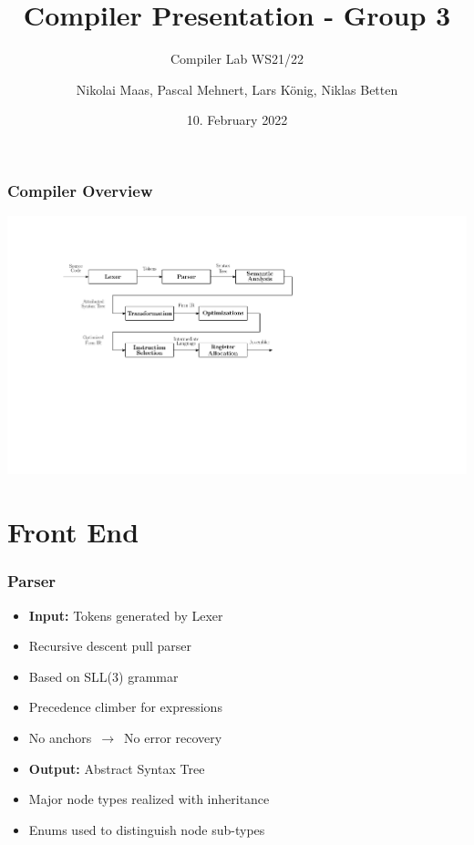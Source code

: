 \documentclass[navbaroff,en]{sdqbeamer}
\title{Compiler Presentation - Group 3}
\subtitle{Compiler Lab WS21/22}
\author[Nikolai, Pascal, Lars, Niklas]{Nikolai Maas, Pascal Mehnert, Lars König, Niklas Betten}
\date[10.\,2.\,2022]{10. February 2022}
\begin{document}
\KITtitleframe

\begin{frame}
	\frametitle{Compiler Overview}

	\centering \includegraphics[scale=0.5]{images/phases.ipe.pdf}

\end{frame}


\section{Front End}

\begin{frame}
	\frametitle{Parser}

	\begin{itemize}
		\item \textbf{Input:} Tokens generated by Lexer
		\item Recursive descent pull parser
		\item Based on SLL(3) grammar
		\item Precedence climber for expressions
		\item No anchors $\,\longrightarrow\,$ No error recovery

		\vspace{1em}

		\item \textbf{Output:} Abstract Syntax Tree
		\item Major node types realized with inheritance
		\item Enums used to distinguish node sub-types
	\end{itemize}

\end{frame}
\end{document}
